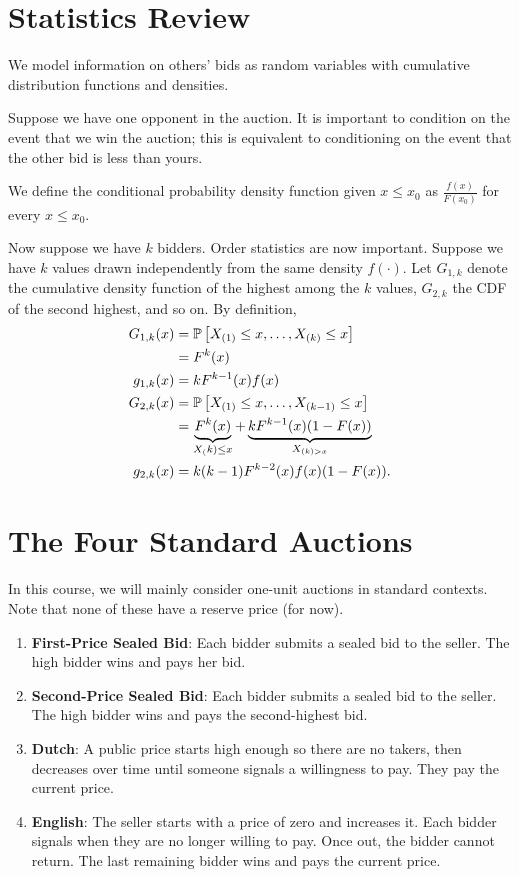 \section{Statistics Review}

We model information on others' bids as random variables with cumulative distribution functions and densities. 

Suppose we have one opponent in the auction. It is important to condition on the event that we win the auction; this is equivalent to conditioning on the event that the other bid is less than yours. 

We define the conditional probability density function given $x \le x_0$ as $\frac{f(x)}{F(x_0)}$ for every $x \le x_0$.

Now suppose we have $k$ bidders. Order statistics are now important. Suppose we have $k$ values drawn independently from the same density $f(\cdot )$. Let $G_{1,k}$ denote the cumulative density function of the highest among the $k$ values, $G_{2,k}$ the CDF of the second highest, and so on. By definition,
\begin{align*}
	G_{1,k}(x) &= \P\left[X_{(1)} \le x, \ldots, X_{(k)} \le x\right] \\
			   &= F^{k}(x) \\
	g_{1,k}(x) &= k F^{k-1}(x) f(x) \\
	G_{2,k}(x) &= \P\left[X_{(1)} \le x ,\ldots, X_{(k-1)} \le x\right] \\
			   &= \underbrace{F^k(x)}_{X_(k) \le x} + \underbrace{k F^{k-1}(x) (1-F(x))}_{X_{(k) > x}} \\
	g_{2,k}(x) &= k(k-1)F^{k-2}(x) f(x) (1-F(x)).
\end{align*}

\section{The Four Standard Auctions}

In this course, we will mainly consider one-unit auctions in standard contexts. Note that none of these have a reserve price (for now).

\begin{enumerate}[label=(\roman*)]
	\item \textbf{First-Price Sealed Bid}: Each bidder submits a sealed bid to the seller. The high bidder wins and pays her bid.
	\item \textbf{Second-Price Sealed Bid}: Each bidder submits a sealed bid to the seller. The high bidder wins and pays the second-highest bid.
	\item \textbf{Dutch}: A public price starts high enough so there are no takers, then decreases over time until someone signals a willingness to pay. They pay the current price.
	\item \textbf{English}: The seller starts with a price of zero and increases it. Each bidder signals when they are no longer willing to pay. Once out, the bidder cannot return. The last remaining bidder wins and pays the current price.
\end{enumerate}

